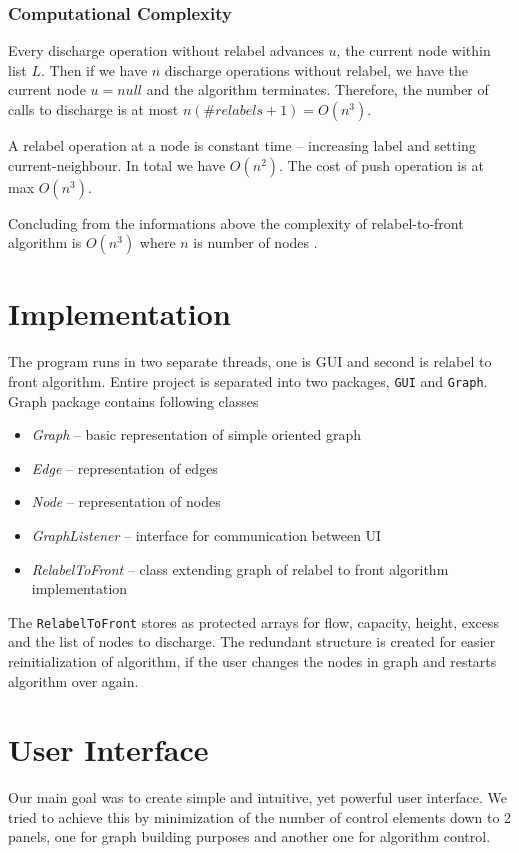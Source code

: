 \documentclass[a4paper,11pt]{article}
\begin{document}
\subsubsection*{Computational Complexity}
Every discharge operation without relabel advances $u$, the current 
node within list $L$. Then if we have $n$ discharge operations without relabel,
we have the current node $u = null$ and the algorithm terminates. Therefore, the
number of calls to discharge is at most $n(\#relabels + 1) = O(n^3)$.

A relabel operation at a node is constant time -- increasing label and setting
current-neighbour. In total we have $O(n^2)$.
The cost of push operation is at max $O(n^3)$.

Concluding from the informations above the complexity of relabel-to-front algorithm
is $O(n^3)$ where $n$ is number of nodes \cite{rtf}. 


\section{Implementation}
The program runs in two separate threads, one is GUI and second is relabel to front
algorithm. Entire project is separated into two packages, \texttt{GUI} and \texttt{Graph}.
Graph package contains following classes
\begin{itemize}
\item \textit{Graph} -- basic representation of simple oriented graph
\item \textit{Edge} -- representation of edges
\item \textit{Node} -- representation of nodes
\item \textit{GraphListener} -- interface for communication between UI
\item \textit{RelabelToFront} -- class extending graph of relabel to front algorithm implementation
\end{itemize}

The \texttt{RelabelToFront} stores as protected arrays for flow, capacity, height,
excess and the list of nodes to discharge. The redundant structure is created for
easier reinitialization of algorithm, if the user changes the nodes in graph and
restarts algorithm over again.




\section{User Interface}
Our main goal was to create simple and intuitive, yet powerful user interface. 
We tried to achieve this by minimization of the number of control elements down 
to 2 panels, one for graph building purposes and another one for algorithm control.
\end{document}
